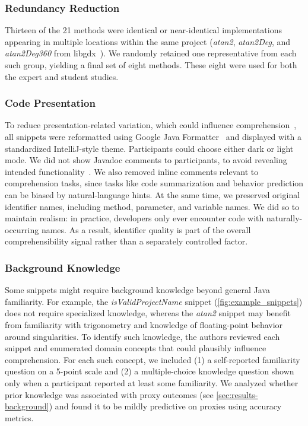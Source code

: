 \subsubsection{Redundancy Reduction}

Thirteen of the 21 methods were identical or near-identical implementations 
appearing in multiple locations within the same project (\eg \emph{atan2},
\emph{atan2Deg}, and \emph{atan2Deg360} from libgdx~\cite{libgdx}).
We randomly retained one representative from each such group, 
yielding a final set of
eight methods. These eight were used for both the expert and
student studies.

\subsubsection{Code Presentation}
\label{sec:snippet-confounders}

To reduce presentation-related variation, which could influence comprehension~\cite{readability}, all snippets were
reformatted using Google Java Formatter~\cite{googlejavaformatter} and
displayed with a standardized IntelliJ-style theme. Participants could
choose either dark or light mode.
We did not show Javadoc comments to participants, to
avoid revealing intended functionality~\cite{identifiernames1,S4, readability}.
We also removed inline comments relevant to comprehension tasks, since tasks like code summarization and behavior
prediction can be biased by natural-language hints.
At the same time, we preserved original identifier names, including
method, parameter, and variable names. We did so to maintain
realism: in practice, developers only ever encounter code with naturally-occurring
names. As a result, identifier quality is part of the
overall comprehensibility signal rather than a separately controlled
factor.

\subsubsection{Background Knowledge}
\label{sec:background-knowledge}

Some snippets might require
background knowledge beyond general Java familiarity.
For example, the \emph{isValidProjectName} snippet
(\cref{fig:example_snippets}) does not require specialized knowledge,
whereas the \emph{atan2} snippet may
benefit from familiarity with trigonometry and knowledge of floating-point
behavior around singularities.
To identify such
knowledge, the authors reviewed each snippet and
enumerated domain concepts that could plausibly influence comprehension.
For each such concept, we included (1) a self-reported
familiarity question on a 5-point scale and (2) a multiple-choice
knowledge question shown only when a participant reported at least
some familiarity. 
We analyzed whether prior knowledge was
associated with proxy outcomes (see \cref{sec:results-background})
and found it to be mildly predictive on proxies using accuracy metrics.


